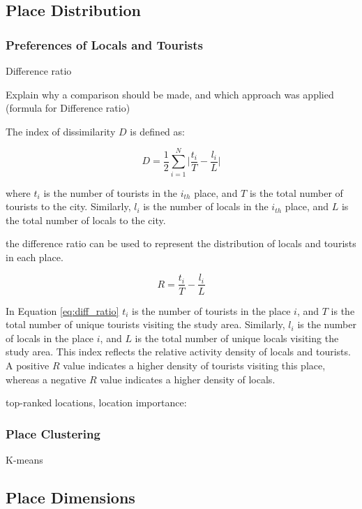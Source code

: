 \documentclass{article}
\begin{document}
\subsection{Place Distribution}
\subsubsection{Preferences of Locals and Tourists}
Difference ratio

Explain why a comparison should be made, and which approach was applied (formula for Difference ratio)

The index of dissimilarity \(D\) is defined as:

\begin{equation} \label{eq:dissimilarity_index}
    D = \frac{1}{2}\sum_{i=1}^{N}\bigg|\frac{t_{i}}{T}-\frac{l_{i}}{L}\bigg|
\end{equation}

where \(t_{i}\) is the number of tourists in the \(i_{th}\) place, and \(T\) is the total number of tourists to the city. Similarly, \(l_{i}\) is the number of locals in the \(i_{th}\) place, and \(L\) is the total number of locals to the city.

the difference ratio can be used to represent the distribution of locals and tourists in each place. 

\begin{equation} \label{eq:diff_ratio}
    R = \frac{t_{i}}{T}-\frac{l_{i}}{L}
\end{equation}

In Equation \ref{eq:diff_ratio}
\(t_{i}\) is the number of tourists in the place \(i\), and \(T\) is the total number of unique tourists visiting the study area. Similarly, \(l_{i}\) is the number of locals in the place \(i\), and \(L\) is the total number of unique locals visiting the study area. This index reflects the relative activity density of locals and tourists. A positive \(R\) value indicates a higher density of tourists visiting this place, whereas a negative \(R\) value indicates a higher density of locals.

top-ranked locations, location importance: \cite{yin_diversified_2011}

\subsubsection{Place Clustering}
K-means

\subsection{Place Dimensions}
\end{document}
